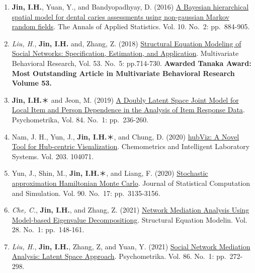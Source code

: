 \documentclass[
]{book}
\begin{document}
\begin{enumerate}
\item
  \textbf{Jin, I.H.}, Yuan, Y., and Bandyopadhyay, D. (2016) \href{https://www.researchgate.net/publication/305627921_A_Bayesian_hierarchical_spatial_model_for_dental_caries_assessment_using_non-Gaussian_Markov_random_fields}{A Bayesian hierarchical spatial model for dental caries assessments using non-gaussian Markov random fields}. The Annals of Applied Statistics. Vol. 10. No.~2: pp.~884-905.
\item
  \emph{Liu, H.}, \textbf{Jin, I.H.} and, Zhang, Z. (2018) \href{https://www.researchgate.net/publication/329215082_Structural_Equation_Modeling_of_Social_Networks_Specification_Estimation_and_Application}{Structural Equation Modeling of Social Networks: Specification, Estimation, and Application}. Multivariate Behavioral Research, Vol. 53. No.~5: pp.714-730. \textbf{Awarded Tanaka Award: Most Outstanding Article in Multivariate Behavioral Research Volume 53.}
\item
  \textbf{Jin, I.H.}＊ and Jeon, M. (2019) \href{https://www.researchgate.net/publication/326276196_A_Doubly_Latent_Space_Joint_Model_for_Local_Item_and_Person_Dependence_in_the_Analysis_of_Item_Response_Data}{A Doubly Latent Space Joint Model for Local Item and Person Dependence in the Analysis of Item Response Data}. Psychometrika, Vol. 84. No.~1: pp.~236-260.
\item
  Nam, J. H., Yun, J., \textbf{Jin, I.H.}＊, and Chung, D. (2020) \href{https://www.researchgate.net/publication/341850019_hubViz_A_Novel_Tool_for_Hub-centric_Visualization}{hubViz: A Novel Tool for Hub-centric Visualization}. Chemometrics and Intelligent Laboratory Systems. Vol. 203. 104071.
\item
  Yun, J., Shin, M., \textbf{Jin, I.H.}＊, and Liang, F. (2020) \href{https://arxiv.org/abs/1810.04811}{Stochastic approximation Hamiltonian Monte Carlo}. Journal of Statistical Computation and Simulation. Vol. 90. No.~17: pp.~3135-3156.
\item
  \emph{Che, C.}, \textbf{Jin, I.H.}, and Zhang, Z. (2021) \href{https://www.researchgate.net/publication/339371541_Network_Mediation_Analysis_Using_Model-Based_Eigenvalue_Decomposition}{Network Mediation Analysis Using Model-based Eigenvalue Decompositiong}. Structural Equation Modelin. Vol. 28. No.~1: pp.~148-161.
\item
  \emph{Liu, H.}, \textbf{Jin, I.H.}, Zhang, Z, and Yuan, Y. (2021) \href{https://arxiv.org/abs/1810.03751}{Social Network Mediation Analysis: Latent Space Approach}. Psychometrika. Vol. 86. No.~1: pp.~272-298.

\end{enumerate}
\end{document}
